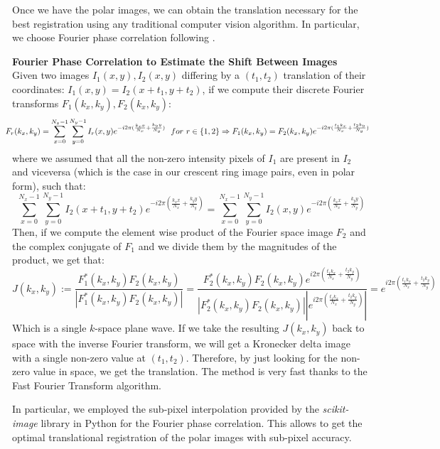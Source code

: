 \documentclass[11pt, a4paper, twoside]{article} %
\DeclareRobustCommand{\mybox}[2][gray!10]{%
\begin{tcolorbox}[   %
        left=0.2cm,
        right=0.2cm,
        top=0.15cm,
        bottom=0.15cm,
        colback=#1,
        colframe=#1,
        width=\dimexpr\textwidth\relax, 
        enlarge left by=0mm,
        boxsep=5pt,
        arc=0pt,outer arc=0pt,
        ]
        #2
\end{tcolorbox}
}
\begin{document}
Once we have the polar images, we can obtain the translation necessary for the best registration using any traditional computer vision algorithm. In particular, we choose Fourier phase correlation following \cite{phase,phase2}.
\mybox{{\bf Fourier Phase Correlation to Estimate the Shift Between Images\vspace{0.2cm}}\\
Given two images $I_1(x,y),I_2(x,y)$ differing by a $(t_1,t_2)$ translation of their coordinates: $I_1(x,y)=I_2(x+t_1,y+t_2)$, if we compute their discrete Fourier transforms $F_1(k_x,k_y),F_2(k_x,k_y)$:
\begin{equation}
\hspace*{-0.3cm}F_r(k_x,k_y)=\sum_{x=0}^{N_x-1}\sum_{y=0}^{N_y-1}I_r(x,y)e^{-i2\pi(\frac{k_xx}{N_x}+\frac{k_yy}{N_y})} \ \ for\ r\in\{1,2\}\Rightarrow F_1(k_x,k_y)=F_2(k_x,k_y)e^{-i2\pi(\frac{t_1k_x}{N_x}+\frac{t_2k_y}{N_y})}
\end{equation}
where we assumed that all the non-zero intensity pixels of $I_1$ are present in $I_2$ and viceversa (which is the case in our crescent ring image pairs, even in polar form), such that:
\begin{equation}
\sum_{x=0}^{N_x-1}\sum_{y=0}^{N_y-1}I_2(x+t_1,y+t_2)e^{-i2\pi(\frac{k_xx}{N_x}+\frac{k_yy}{N_y})}=\sum_{x=0}^{N_x-1}\sum_{y=0}^{N_y-1}I_2(x,y)e^{-i2\pi(\frac{k_xx}{N_x}+\frac{k_yy}{N_y})}
\end{equation} 
Then, if we compute the element wise product of the Fourier space image $F_2$ and the complex conjugate of $F_1$ and we divide them by the magnitudes of the product, we get that:
\begin{equation}
J(k_x,k_y):=\frac{F_1^*(k_x,k_y)F_2(k_x,k_y)}{|F_1^*(k_x,k_y)F_2(k_x,k_y)|}=\frac{F_2^*(k_x,k_y)F_2(k_x,k_y)e^{i2\pi(\frac{t_1k_x}{N_x}+\frac{t_2k_y}{N_y})}}{|F_2^*(k_x,k_y)F_2(k_x,k_y)||e^{i2\pi(\frac{t_1k_x}{N_x}+\frac{t_2k_y}{N_y})}|}=e^{i2\pi(\frac{t_1k_x}{N_x}+\frac{t_2k_y}{N_y})}
\end{equation}
Which is a single $k$-space plane wave. If we take the resulting $J(k_x,k_y)$ back to space with the inverse Fourier transform, we will get a Kronecker delta image with a single non-zero value at $(t_1,t_2)$. Therefore, by just looking for the non-zero value in space, we get the translation. The method is very fast thanks to the Fast Fourier Transform algorithm.
}

In particular, we employed the sub-pixel interpolation provided by the {\em scikit-image} library in Python \cite{skimage} for the Fourier phase correlation. This allows to get the optimal translational registration of the polar images with sub-pixel accuracy.
\end{document}
